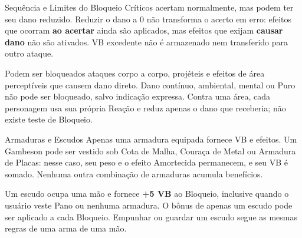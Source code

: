 \begin{rpgboxtips}{Sequência e Limites do Bloqueio}
Críticos acertam normalmente, mas podem ter seu dano reduzido. Reduzir o dano a 0 não transforma o acerto em erro: efeitos que ocorram \textbf{ao acertar} ainda são aplicados, mas efeitos que exijam \textbf{causar dano} não são ativados. VB excedente não é armazenado nem transferido para outro ataque.

Podem ser bloqueados ataques corpo a corpo, projéteis e efeitos de área perceptíveis que causem dano direto. Dano contínuo, ambiental, mental ou Puro não pode ser bloqueado, salvo indicação expressa. Contra uma área, cada personagem usa sua própria Reação e reduz apenas o dano que receberia; não existe teste de Bloqueio.
\end{rpgboxtips}

\begin{rpgboxtips}{Armaduras e Escudos}
Apenas uma armadura equipada fornece VB e efeitos. Um Gambeson pode ser vestido sob Cota de Malha, Couraça de Metal ou Armadura de Placas: nesse caso, seu peso e o efeito Amortecida permanecem, e seu VB é somado. Nenhuma outra combinação de armaduras acumula benefícios.

Um escudo ocupa uma mão e fornece \textbf{+5 VB} ao Bloqueio, inclusive quando o usuário veste Pano ou nenhuma armadura. O bônus de apenas um escudo pode ser aplicado a cada Bloqueio. Empunhar ou guardar um escudo segue as mesmas regras de uma arma de uma mão.
\end{rpgboxtips}
